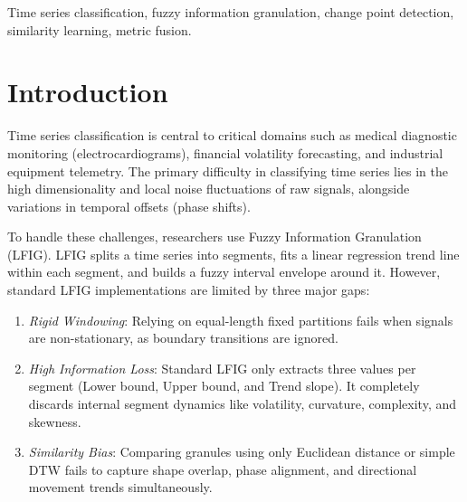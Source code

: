 \documentclass[conference]{IEEEtran}
\begin{document}
\begin{IEEEkeywords}
Time series classification, fuzzy information granulation, change point detection, similarity learning, metric fusion.
\end{IEEEkeywords}

\section{Introduction}

Time series classification is central to critical domains such as medical diagnostic monitoring (electrocardiograms), financial volatility forecasting, and industrial equipment telemetry. The primary difficulty in classifying time series lies in the high dimensionality and local noise fluctuations of raw signals, alongside variations in temporal offsets (phase shifts).

To handle these challenges, researchers use Fuzzy Information Granulation (LFIG). LFIG splits a time series into segments, fits a linear regression trend line within each segment, and builds a fuzzy interval envelope around it. However, standard LFIG implementations are limited by three major gaps:
\begin{enumerate}
    \item \textit{Rigid Windowing}: Relying on equal-length fixed partitions fails when signals are non-stationary, as boundary transitions are ignored.
    \item \textit{High Information Loss}: Standard LFIG only extracts three values per segment (Lower bound, Upper bound, and Trend slope). It completely discards internal segment dynamics like volatility, curvature, complexity, and skewness.
    \item \textit{Similarity Bias}: Comparing granules using only Euclidean distance or simple DTW fails to capture shape overlap, phase alignment, and directional movement trends simultaneously.
\end{enumerate}
\end{document}
